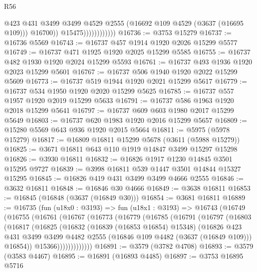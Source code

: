 \begin{lexlean}{R56}
\begin{coremodule}
                                @423
                                @431
                                @3499
                                @3499
                                @4529
                                @2555
                                (@16692 @109 @4529 (@3637 (@16695 @109)))
                                @16700))
                            @15475))))))))))))
@16736 := @3753 @15279
@16737 := @16736 @5569
@16743 := @16737 @457 @1914 @1920 @2026 @15299 @5577
@16749 := @16737 @471 @1925 @1920 @2025 @15299 @5585
@16755 := @16737 @482 @1930 @1920 @2024 @15299 @5593
@16761 := @16737 @493 @1936 @1920 @2023 @15299 @5601
@16767 := @16737 @506 @1940 @1920 @2022 @15299 @5609
@16773 := @16737 @519 @1944 @1920 @2021 @15299 @5617
@16779 := @16737 @534 @1950 @1920 @2020 @15299 @5625
@16785 := @16737 @557 @1957 @1920 @2019 @15299 @5633
@16791 := @16737 @586 @1963 @1920 @2018 @15299 @5641
@16797 := @16737 @609 @603 @1980 @2017 @15299 @5649
@16803 := @16737 @620 @1983 @1920 @2016 @15299 @5657
@16809 := @15280 @5569 @643 @936 @1920 @2015 @5664
@16811 := @5975 (@5978 @15279)
@16817 := @16809 @16811 @15299 @5678 (@3611 (@5988 @15279))
@16825 := @3671 @16811 @643 @110 @1919 @14847 @3499 @15297 @15298
@16826 := @3930 @16811
@16832 := @16826 @1917 @1230 @14845 @3501 @15295 @9727
@16839 := @3998 @16811 @539 @1447 @3501 @14844 @15327 @15295
@16845 := @16826 @419 @431 @3499 @3499 @4666 @2555
@16846 := @3632 @16811
@16848 := @16846 @30 @4666
@16849 := @3638 @16811
@16853 := @16845 (@16848 (@3637 (@16849 @30)))
@16854 := @3681 @16811
@16889 := @16735
    (fun (u18x0 : @3193) =>
    fun (u18x1 : @3193) =>
    @16743
      (@16749
        (@16755
          (@16761
            (@16767
              (@16773
                (@16779
                  (@16785
                    (@16791
                      (@16797
                        (@16803
                          (@16817
                            (@16825
                              (@16832
                                (@16839 (@16853 @16854) @15348)
                                (@16826
                                  @423
                                  @431
                                  @3499
                                  @3499
                                  @4482
                                  @2555
                                  (@16846 @109 @4482 (@3637 (@16849 @109)))
                                  @16854))
                              @15366)))))))))))))
@16891 := @3579 (@3782 @4708)
@16893 := @3579 (@3583 @4467)
@16895 := @16891 (@16893 @4485)
@16897 := @3753 @16895 @5716

\end{coremodule}
\end{lexlean}
